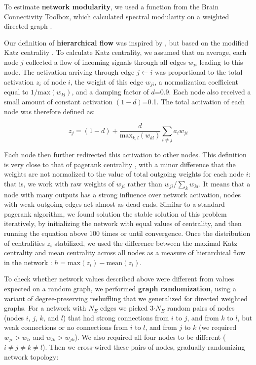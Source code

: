 \documentclass{article}
\begin{document}
To estimate \textbf{network modularity}, we used a function from the Brain Connectivity Toolbox, which calculated spectral modularity on a weighted directed graph \citep{reichardt2006community,leicht2008community}.

Our definition of \textbf{hierarchical flow} was inspired by \citep{mones2012hierarchy,czegel2015hierarchy}, but based on the modified Katz centrality \citep{katz1953original,fletcher2018katz}. To calculate Katz centrality, we assumed that on average, each node $j$ collected a flow of incoming signals through all edges $w_{ji}$ leading to this node. The activation arriving through edge $j\leftarrow i$ was proportional to the total activation $z_i$ of node $i$, the weight of this edge $w_{ji}$, a normalization coefficient equal to $1/\text{max}(w_{kl})$, and a damping factor of $d$=0.9. Each node also received a small amount of constant activation $(1-d)$=0.1. The total activation of each node was therefore defined as:

\[ z_j = (1-d) + \frac{d}{\text{max}_{k,l}(w_{kl})} \sum_{i \neq j}{a_i w_{ji}} \]

Each node then further redirected this activation to other nodes. This definition is very close to that of pagerank centrality \citep{page1999pagerank}, with a minor difference that the weights are not normalized to the value of total outgoing weights for each node $i$: that is, we work with raw weights of $w_{ji}$ rather than $w_{ji}/\sum_k{w_{ki}}$. It means that a node with many outputs has a strong influence over network activation, nodes with weak outgoing edges act almost as dead-ends. Similar to a standard pagerank algorithm, we found solution the stable solution of this problem iteratively, by initializing the network with equal values of centrality, and then running the equation above 100 times or until convergence. Once the distribution of centralities $z_i$ stabilized, we used the difference between the maximal Katz centrality and mean centrality across all nodes as a measure of hierarchical flow in the network \citep{mones2012hierarchy,czegel2015hierarchy}: $h = \text{max}(z_i) - \text{mean}(z_i)$.

To check whether network values described above were different from values expected on a random graph, we performed \textbf{graph randomization}, using a variant of degree-preserving reshuffling \citep{maslov2002} that we generalized for directed weighted graphs. For a network with $N_E$ edges we picked 3$\cdot N_E$ random pairs of nodes (nodes $i$, $j$, $k$, and $l$) that had strong connections from $i$ to $j$, and from $k$ to $l$, but weak connections or no connections from $i$ to $l$, and from $j$ to $k$ (we required $w_{ji}>w_{li}$ and $w_{lk}>w_{jk}$). We also required all four nodes to be different ($i \neq j \neq k \neq l$). Then we cross-wired these pairs of nodes, gradually randomizing network topology:
\end{document}
